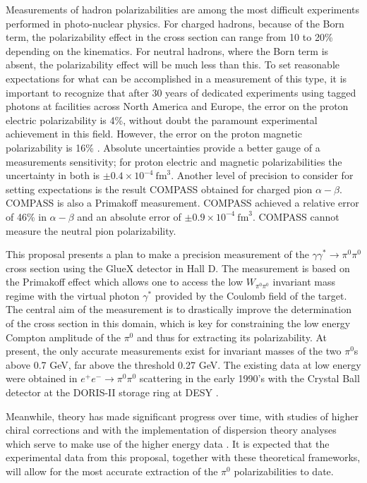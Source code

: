 Measurements of hadron polarizabilities are among the most difficult
experiments performed in photo-nuclear physics. For charged hadrons,
because of the Born term, the polarizability effect in the cross
section can range from 10 to 20\% depending on the kinematics.  For
neutral hadrons, where the Born term is absent, the polarizability
effect will be much less than this.  To set reasonable expectations
for what can be accomplished in a measurement of this type, it is
important to recognize that after 30 years of dedicated experiments
using tagged photons at facilities across North America and Europe,
the error on the proton electric polarizability is 4\%, without doubt
the paramount experimental achievement in this field. However, the
error on the proton magnetic polarizability is 16\%
\cite{PDGTanabashi:2018oca}.  Absolute uncertainties provide a better
gauge of a measurements sensitivity; for proton electric and magnetic
polarizabilities the uncertainty in both is $\pm 0.4 \times
10^{-4}~\mathrm{fm}^3$.  Another level of precision to consider for
setting expectations is the result COMPASS obtained for charged pion
$\alpha - \beta$. COMPASS is also a Primakoff measurement. COMPASS
achieved a relative error of 46\% in $\alpha - \beta$ and an absolute
error of $\pm 0.9 \times 10^{-4}~\mathrm{fm}^3$.  COMPASS cannot
measure the neutral pion polarizability.



This proposal presents a plan to make a precision measurement of the
$\gamma \gamma^* \rightarrow \pi^0 \pi^0$ cross section using the
GlueX detector in Hall D.  The measurement is based on the Primakoff
effect which allows one to access the low $W_{\pi^0\pi^0}$ invariant
mass regime with the virtual photon $\gamma^*$ provided by the
Coulomb field of the target. The central aim of the measurement is to
drastically improve the determination of the cross section in this
domain, which is key for constraining the low energy Compton amplitude
of the $\pi^0$ and thus for extracting its polarizability.  At
present, the only accurate measurements exist for invariant masses of
the two $\pi^0$s above 0.7 GeV, far above the threshold 0.27 GeV. The
existing data at low energy were obtained in $e^+ e^- \to \pi^0\pi^0 $
scattering in the early 1990's with the Crystal Ball detector at the
DORIS-II storage ring at DESY \cite{Marsiske:1990hx}.

Meanwhile, theory has made significant progress over time, with
studies of higher chiral corrections 
\cite{Bellucci:1994eb,Gasser:2005ud,Aleksejevs:2014eea} and with the
implementation of dispersion theory analyses which serve to make use
of the higher energy data
\cite{Oller:2008kf,Dai:2014zta,Dai:2014lza,Moussallam:2013una}. It is
expected that the experimental data from this proposal, together with
these theoretical frameworks, will allow for the most accurate
extraction of the $\pi^0$ polarizabilities to date.
